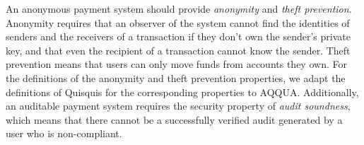 An anonymous payment system should provide \emph{anonymity} and \emph{theft prevention}.
Anonymity requires that an observer of the system cannot find the identities of senders and the receivers of a transaction if they don't own the sender's private key, and that even the recipient of a transaction cannot know the sender. 
Theft prevention means that users can only move funds from accounts they own. For the definitions of the anonymity and theft prevention properties, we adapt the definitions of Quisquis for the corresponding properties to AQQUA.
Additionally, an auditable payment system requires the security property of \emph{audit soundness}, 
which means that there cannot be a successfully verified audit generated by a user who is non-compliant. 


